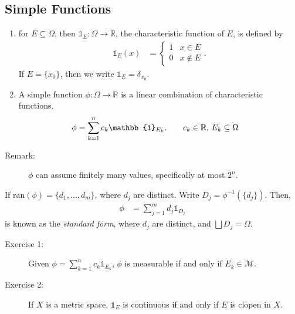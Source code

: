 \documentclass[10pt]{extarticle}
\newcommand{\R}{\mathbb{R}}
\begin{document}
  \subsection{Simple Functions}%
  \begin{enumerate}[(1)]
    \item for $E\subseteq \Omega$, then $\mathbb{1}_E: \Omega\rightarrow \R$, the characteristic function of $E$, is defined by
      \begin{align*}
        \mathbb{1}_E(x) &= \begin{cases}
          1 & x\in E\\
          0 & x\notin E
        \end{cases}.
      \end{align*}
        If $E = \{x_0\}$, then we write $\mathbb{1}_E = \delta_{x_0}$.
    \item A simple function $\phi: \Omega \rightarrow \R$ is a linear combination of characteristic functions.
      \begin{align*}
        \phi &= \sum_{k=1}^{n}c_k\mathbb{1}_{E_k}. \tag*{$c_k\in \R$, $E_k\subseteq \Omega$}
      \end{align*}
  \end{enumerate}
  \begin{description}
    \item[Remark:] $\phi$ can assume finitely many values, specifically at most $2^n$.
  \end{description}
  If $\text{ran}(\phi) = \{d_1,\dots,d_m\}$, where $d_j$ are distinct. Write $D_j = \phi^{-1}(\{d_j\})$. Then,
  \begin{align*}
    \phi &= \sum_{j=1}^{m}d_j\mathbb{1}_{D_j}
  \end{align*}
  is known as the \textit{standard form}, where $d_j$ are distinct, and $\bigsqcup D_j = \Omega$.
  \begin{description}
    \item[Exercise 1:] Given $\phi = \sum_{k=1}^{n}c_k\mathbb{1}_{E_k}$, $\phi$ is measurable if and only if $E_k \in \mathcal{M}$.
    \item[Exercise 2:] If $X$ is a metric space, $\mathbb{1}_E$ is continuous if and only if $E$ is clopen in $X$.
  \end{description}
\end{document}
